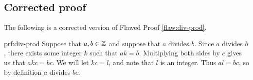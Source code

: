 \clearpage
\subsection{Corrected proof}

The following is a corrected version of Flawed Proof \ref{flaw:div-prod}. 

\begin{prf}{prf:div-prod} 
Suppose that $a,b \in \mathbb Z$ and suppose that $a$ divides $b$.
Since $a$ divides $b$, there exists some integer $k$ such that $ak = b$. Multiplying both sides by $c$ gives us that $akc = bc$. We will let $kc = l$, and note that $l$ is an integer. Thus $al = bc$, so by definition $a$ divides $bc$. 

\end{prf}